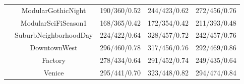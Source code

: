 \begin{table}[!t]
\begin{tabular}{p{1.4cm}<{\centering}|c|ccc}
                  & ModularGothicNight & 190/360/0.52 & 244/423/0.62&272/456/0.76\\
                  &ModularSciFiSeason1 & 168/365/0.42 &172/354/0.42&211/393/0.48\\ \hline
{} &SuburbNeighborhoodDay & 224/422/0.64 &328/457/0.72&242/457/0.76\\
                  &DowntownWest & 296/460/0.78 &317/456/0.76		&292/469/0.86 \\
                  & Factory & 278/434/0.64 &291/452/0.74&249/435/0.64\\
                  & Venice & 295/441/0.70 &323/448/0.82&294/474/0.84\\ \hline
\end{tabular}
    \label{tab:eval_res}
\end{table}

